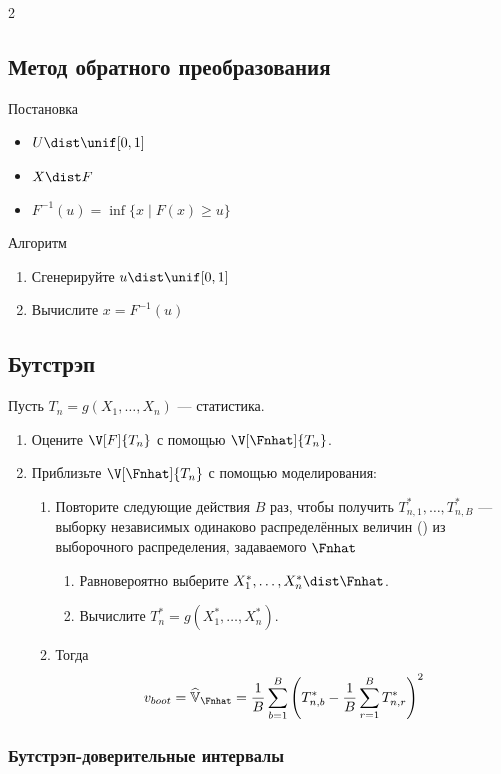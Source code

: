 \documentclass[landscape]{article}
\begin{document}
\begin{multicols*}{2}
\subsection{Метод обратного преобразования}

Постановка
\begin{itemize}
  \item $U \dist \unif[0,1]$
  \item $X \dist F$
  \item $F^{-1}(u)= \inf\{ x \mid F(x) \ge u\}$
\end{itemize}

Алгоритм
\begin{enumerate}
  \item Сгенерируйте $u \dist \unif[0,1]$
  \item Вычислите $x = F^{-1}(u)$
\end{enumerate}

\subsection{Бутстрэп}

Пусть $T_n = g(X_1,\dots,X_n)$ — статистика.
\begin{enumerate}
  \item Оцените $\V[F]{T_n}$ с помощью $\V[\Fnhat]{T_n}$.
  \item Приблизьте $\V[\Fnhat]{T_n}$ с помощью моделирования:
    \begin{enumerate}
      \item Повторите следующие действия $B$ раз, чтобы получить $T_{n,1}^*,\dots,T_{n,B}^*$ —
        выборку независимых одинаково распределённых величин (\iid) из выборочного
        распределения, задаваемого $\Fnhat$
        \begin{enumerate}
          \item Равновероятно выберите $X_1^*,\dots,X_n^* \dist \Fnhat$.
          \item Вычислите $T_n^* = g(X_1^*,\dots,X_n^*)$.
        \end{enumerate}
      \item Тогда
        \[v_{boot} = \widehat{\mathbb{V}}_{\Fnhat} =
          \displaystyle\frac{1}{B} \sum_{b=1}^B
            \left(T_{n,b}^* - \frac{1}{B} \sum_{r=1}^B T_{n,r}^* \right)^2\]
    \end{enumerate}
\end{enumerate}

\subsubsection{Бутстрэп-доверительные интервалы}


\end{multicols*}
\end{document}
